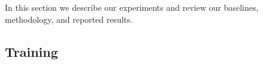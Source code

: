 \documentclass[11pt,a4paper]{article}
\theoremstyle{plain}
\begin{document}
In this section we describe our experiments and review our baselines,
methodology, and reported results.

\subsection{Training}
\end{document}

